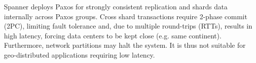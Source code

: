 Spanner deploys Paxos for strongly consistent replication and shards data internally across Paxos groups.
Cross shard transactions require 2-phase commit (2PC), limiting fault tolerance and, due to multiple round-trips (RTTs), results in high latency, forcing data centers to be kept close (e.g. same continent). 
Furthermore, network partitions may halt the system.
It is thus not suitable for geo-distributed applications requiring low latency.


%
%
%

